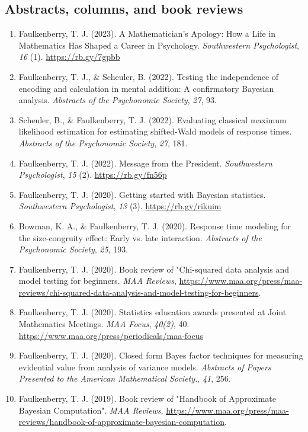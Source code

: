 \documentclass[article,10pt]{article}
\begin{document}
\subsection*{Abstracts, columns, and book reviews}
\label{sec:org9c43508}
\begin{enumerate}
\item Faulkenberry, T. J. (2023). A Mathematician's Apology: How a Life in Mathematics Has Shaped a Career in Psychology. \emph{Southwestern Psychologist}, \emph{16} (1). \url{https://rb.gy/7gpbb}
\item Faulkenberry, T. J., \& Scheuler, B. (2022). Testing the independence of encoding and calculation in mental addition: A confirmatory Bayesian analysis. \emph{Abstracts of the Psychonomic Society}, \emph{27}, 93.
\item Scheuler, B., \& Faulkenberry, T. J. (2022). Evaluating classical maximum likelihood estimation for estimating shifted-Wald models of response times. \emph{Abstracts of the Psychonomic Society}, \emph{27}, 181.
\item Faulkenberry, T. J. (2022). Message from the President. \emph{Southwestern Psychologist}, \emph{15} (2). \url{https://rb.gy/fn56p}
\item Faulkenberry, T. J. (2020). Getting started with Bayesian statistics. \emph{Southwestern Psychologist}, \emph{13} (3). \url{https://rb.gy/rikuim}
\item Bowman, K. A., \& Faulkenberry, T. J. (2020). Response time modeling for the size-congruity effect: Early vs. late interaction. \emph{Abstracts of the Psychonomic Society}, \emph{25}, 193.
\item Faulkenberry, T. J. (2020). Book review of "Chi-squared data analysis and model testing for beginners. \emph{MAA Reviews}, \url{https://www.maa.org/press/maa-reviews/chi-squared-data-analysis-and-model-testing-for-beginners}.
\item Faulkenberry, T. J. (2020). Statistics education awards presented at Joint Mathematics Meetings. \emph{MAA Focus}, \emph{40(2)}, 40. \url{https://www.maa.org/press/periodicals/maa-focus}
\item Faulkenberry, T. J. (2020). Closed form Bayes factor techniques for measuring evidential value from analysis of variance models. \emph{Abstracts of Papers Presented to the American Mathematical Society.}, \emph{41}, 256.
\item Faulkenberry, T. J. (2019). Book review of "Handbook of Approximate Bayesian Computation". \emph{MAA Reviews}, \url{https://www.maa.org/press/maa-reviews/handbook-of-approximate-bayesian-computation}.

\end{enumerate}
\end{document}
